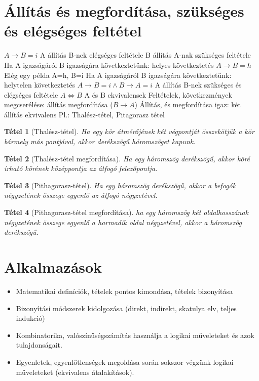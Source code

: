 \documentclass[twoside,12pt]{report}
\newtheorem{theorem}{Tétel}[section]
\theoremstyle{definition}
\begin{document}
\section{Állítás és megfordítása, szükséges és elégséges feltétel}
	\begin{outline}
		\1 $A\rightarrow B=i$
			\2 A állítás B-nek elégséges feltétele
			\2 B állítás A-nak szükséges feltétele
			\2 Ha A igazságáról B igazságára következtetünk: helyes következtetés
		\1 $A\rightarrow B=h$
			\2 Elég egy példa A=h, B=i
			\2 Ha A igazságáról B igazságára következtetünk: helytelen következtetés
		\1 $A\rightarrow B=i \wedge B\rightarrow A=i$
			\2 A állítás B-nek szükséges és elégséges feltétele
			\2 $A\Leftrightarrow B$
			\2 A és B ekvivalensek
		\1 Feltételek, következmények megcserélése: állítás megfordítása ($B\rightarrow A$)
			\2 Állítás, és megfordítása igaz: két állítás ekvivalens
				\3 Pl.: Thalész-tétel, Pitagorasz tétel
	\end{outline}
	\begin{theorem}[Thalész-tétel]
		Ha egy kör átmérőjének két végpontját összekötjük a kör bármely más
		pontjával, akkor derékszögű háromszöget kapunk.
	\end{theorem}
	\begin{theorem}[Thalész-tétel megfordítása]
		Ha egy háromszög derékszögű, akkor köré írható körének középpontja az átfogó felezőpontja.
	\end{theorem}
	\begin{theorem}[Pithagorasz-tétel]
		Ha egy háromszög derékszögű, akkor a befogók négyzetének összege egyenlő az átfogó négyzetével.
	\end{theorem}
	\begin{theorem}[Pithagorasz-tétel megfordítása]
		ha egy háromszög két oldalhosszának négyzetének összege egyenlő a harmadik oldal négyzetével, akkor a háromszög derékszögű.
	\end{theorem}
\section{Alkalmazások}
	\begin{itemize}
		\item Matematikai definíciók, tételek pontos kimondása, tételek bizonyítása
		\item Bizonyítási módszerek kidolgozása (direkt, indirekt, skatulya elv, teljes indukció)
		\item Kombinatorika, valószínűségszámítás használja a logikai műveleteket és azok tulajdonságait.
		\item Egyenletek, egyenlőtlenségek megoldása során sokszor végzünk logikai műveleteket (ekvivalens átalakítások).
	\end{itemize}
\end{document}
